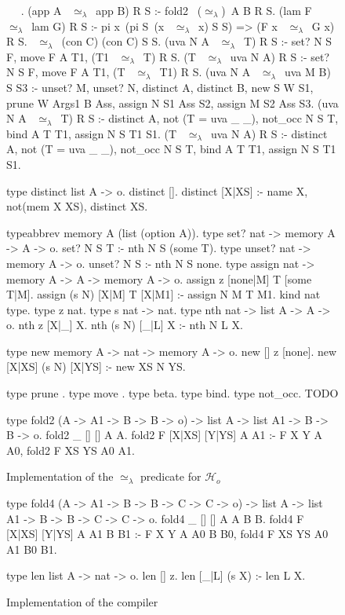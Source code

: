 \documentclass[sigconf,natbib=false]{acmart}
\newcommand{\UnifRel}{\ensuremath{\simeq}}
\newcommand{\Ue}{\ensuremath{\UnifRel_\lambda}\xspace}
\newcommand{\Ho}{\ensuremath{\mathcal{H}_o}\xspace}
\begin{document}
\begin{figure*}
\begin{elpicode}
~ \PYG{n+nf}{(\Ue)} ~.
(app A ~\Ue~app B) R S :- fold2 ~(\Ue)~A B R S.
(lam F ~\Ue~lam G) R S :- pi x\ (pi S\ (x ~\Ue~x) S S) => (F x ~\Ue~G x) R S.
~\Ue~(con C) (con C) S S.
(uva N A ~\Ue~T) R S :- set? N S F, move F A T1, (T1 ~\Ue~T) R S.
(T ~\Ue~uva N A) R S :- set? N S F, move F A T1, (T ~\Ue~T1) R S.
(uva N A ~\Ue~uva M B) S S3 :-  unset? M, unset? N,
  distinct A, distinct B, 
  new S W S1, prune W Args1 B Ass, 
  assign N S1 Ass S2, assign M S2 Ass S3.
(uva N A ~\Ue~T) R S :- distinct A, not (T = uva _ _), not_occ N S T,  
  bind A T T1, assign N S T1 S1.
(T ~\Ue~uva N A) R S :- distinct A, not (T = uva _ _), not_occ N S T, 
  bind A T T1, assign N S T1 S1. 
      
type distinct list A -> o.
distinct [].
distinct [X|XS] :- name X, not(mem X XS),
distinct XS.

typeabbrev memory A (list (option A)).
type set? nat -> memory A -> A -> o.
set? N S T :- nth N S (some T).
type unset? nat -> memory A -> o.
unset? N S :- nth N S none.
type assign nat -> memory A -> A -> memory A -> o.
assign z [none|M] T [some T|M].
assign (s N) [X|M] T [X|M1] :- assign N M T M1. 
kind nat type.
type z nat.
type s nat -> nat.
type nth nat -> list A -> A -> o.
nth z [X|_] X.
nth (s N) [_|L] X :- nth N L X.

type new memory A -> nat -> memory A -> o.
new [] z [none].
new [X|XS] (s N) [X|YS] :- new XS N YS.

type prune .
type move .
type beta.
type bind.
type not_occ.
TODO

type fold2 (A -> A1 -> B -> B -> o) -> list A -> list A1 -> B -> B -> o.
fold2 _ [] [] A A.
fold2 F [X|XS] [Y|YS] A A1 :- F X Y A A0, fold2 F XS YS A0 A1.

\end{elpicode}
\caption{Implementation of the \Ue predicate for \Ho}
\label{code:ue-pred}
\end{figure*}

\begin{figure*}
\begin{elpicode}
type fold4 (A -> A1 -> B -> B -> C -> C -> o) -> list A -> list A1 -> B -> B -> C -> C -> o.
fold4 _ [] [] A A B B.
fold4 F [X|XS] [Y|YS] A A1 B B1 :- F X Y A A0 B B0, fold4 F XS YS A0 A1 B0 B1.

type len list A -> nat -> o.
len [] z.
len [_|L] (s X) :- len L X.

\end{elpicode}
\caption{Implementation of the compiler}
\label{code:ue-pred}
\end{figure*}
  
\end{document}
